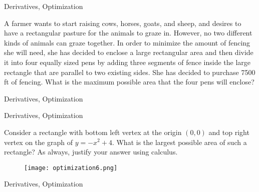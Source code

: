 \begin{tagblock}{Derivatives, Optimization}

\begin{question}

A farmer wants to start raising cows, horses, goats, and sheep, and desires to have a rectangular pasture for the animals to graze in. However, no two different kinds of animals can graze together. In order to minimize the amount of fencing she will need, she has decided to enclose a large rectangular area and then divide it into four equally sized pens by adding three segments of fence inside the large rectangle that are parallel to two existing sides. She has decided to purchase 7500 ft of fencing. What is the maximum possible area that the four pens will enclose?


	
\begin{tags}
	   Derivatives, Optimization

\end{tags}
	
\begin{diary}
\end{diary}
	
\begin{solution}
	   
\end{solution}
	
\end{question}

\end{tagblock}


\begin{tagblock}{Derivatives, Optimization}

\begin{question}

Consider a rectangle with bottom left vertex at the origin $(0,0)$ and top right vertex on the graph of $y=-x^2 +4$.  What is the largest possible area of such a rectangle?  As always, justify your answer using calculus.  
\begin{figure}[h]
\texttt{[image: optimization6.png]} 
\end{figure}


	
\begin{tags}
	   Derivatives, Optimization

\end{tags}
	
\begin{diary}
\end{diary}
	
\begin{solution}
	   
\end{solution}
	
\end{question}

\end{tagblock}

